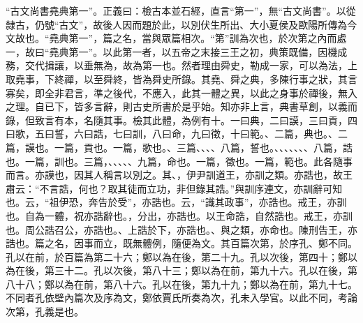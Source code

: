  {\noindent\shu{}\fzkt “古文尚書堯典第一”。正義曰：檢古本並石經，直言“第一”，無“古文尚書”。以從隸古，仍號“古文”，故後人因而題於此，以別伏生所出、大小夏侯及歐陽所傳為今文故也。“堯典第一”，篇之名，當與眾篇相次。“第”訓為次也，於次第之內而處一，故曰“堯典第一”。以此第一者，以五帝之末接三王之初，典策既備，因機成務，交代揖讓，以垂無為，故為第一也。然者理由舜史，勒成一家，可以為法，上取堯事，下終禪，以至舜終，皆為舜史所錄。其堯、舜之典，多陳行事之狀，其言寡矣，即全非君言，準之後代，不應入，此其一體之異，以此之身事於禪後，無入之理。自已下，皆多言辭，則古史所書於是乎始。知亦非上言，典書草創，以義而錄，但致言有本，名隨其事。檢其此體，為例有十。一曰典，二曰謨，三曰貢，四曰歌，五曰誓，六曰誥，七曰訓，八曰命，九曰徵，十曰範。、二篇，典也。、二篇，謨也。一篇，貢也。一篇，歌也。、三篇、、、、八篇，誓也。、、、、、、、八篇，誥也。一篇，訓也。三篇，、、、、、九篇，命也。一篇，徵也。一篇，範也。此各隨事而言。亦謨也，因其人稱言以別之。其、，伊尹訓道王，亦訓之類。亦誥也，故王肅云：“不言誥，何也？取其徒而立功，非但錄其誥。”與訓序連文，亦訓辭可知也。云，“祖伊恐，奔告於受”，亦誥也。云，“識其政事”，亦誥也。戒王，亦訓也。自為一體，祝亦誥辭也。，分出，亦誥也。以王命誥，自然誥也。戒王，亦訓也。周公誥召公，亦誥也。、上誥於下，亦誥也。、與之類，亦命也。陳刑告王，亦誥也。篇之名，因事而立，既無體例，隨便為文。其百篇次第，於序孔、鄭不同。孔以在前，於百篇為第二十六；鄭以為在後，第二十九。孔以次後，第四十；鄭以為在後，第三十二。孔以次後，第八十三；鄭以為在前，第九十六。孔以在後，第八十八；鄭以為在前，第八十六。孔以在後，第九十九；鄭以為在前，第九十七。不同者孔依壁內篇次及序為文，鄭依賈氏所奏為次，孔未入學官。以此不同，考論次第，孔義是也。 \par}

